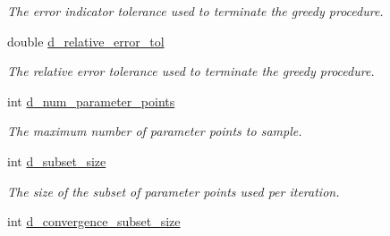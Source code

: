 \begin{DoxyCompactItemize}
\begin{DoxyCompactList}\small\item\em The error indicator tolerance used to terminate the greedy procedure. \end{DoxyCompactList}\item 
\hypertarget{class_c_a_r_o_m_1_1_greedy_parameter_point_sampler_a3cfb0ed9defd9fa00da8f59d1b90c0f8}{double \hyperlink{class_c_a_r_o_m_1_1_greedy_parameter_point_sampler_a3cfb0ed9defd9fa00da8f59d1b90c0f8}{d\-\_\-relative\-\_\-error\-\_\-tol}}\label{class_c_a_r_o_m_1_1_greedy_parameter_point_sampler_a3cfb0ed9defd9fa00da8f59d1b90c0f8}

\begin{DoxyCompactList}\small\item\em The relative error tolerance used to terminate the greedy procedure. \end{DoxyCompactList}\item 
\hypertarget{class_c_a_r_o_m_1_1_greedy_parameter_point_sampler_a7dab631f13f8c2e8d3fb00bcae0ee435}{int \hyperlink{class_c_a_r_o_m_1_1_greedy_parameter_point_sampler_a7dab631f13f8c2e8d3fb00bcae0ee435}{d\-\_\-num\-\_\-parameter\-\_\-points}}\label{class_c_a_r_o_m_1_1_greedy_parameter_point_sampler_a7dab631f13f8c2e8d3fb00bcae0ee435}

\begin{DoxyCompactList}\small\item\em The maximum number of parameter points to sample. \end{DoxyCompactList}\item 
\hypertarget{class_c_a_r_o_m_1_1_greedy_parameter_point_sampler_ad2081b44f24760995bec3ffb2badd2e1}{int \hyperlink{class_c_a_r_o_m_1_1_greedy_parameter_point_sampler_ad2081b44f24760995bec3ffb2badd2e1}{d\-\_\-subset\-\_\-size}}\label{class_c_a_r_o_m_1_1_greedy_parameter_point_sampler_ad2081b44f24760995bec3ffb2badd2e1}

\begin{DoxyCompactList}\small\item\em The size of the subset of parameter points used per iteration. \end{DoxyCompactList}\item 
\hypertarget{class_c_a_r_o_m_1_1_greedy_parameter_point_sampler_a7e6ec847dbdc33b69278629b13cd651d}{int \hyperlink{class_c_a_r_o_m_1_1_greedy_parameter_point_sampler_a7e6ec847dbdc33b69278629b13cd651d}{d\-\_\-convergence\-\_\-subset\-\_\-size}}\label{class_c_a_r_o_m_1_1_greedy_parameter_point_sampler_a7e6ec847dbdc33b69278629b13cd651d}


\end{DoxyCompactItemize}
